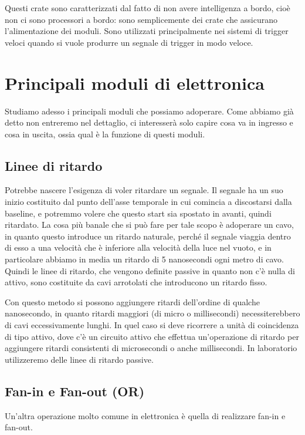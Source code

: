 Questi crate sono caratterizzati dal fatto di non avere intelligenza a bordo, cioè non ci sono processori a bordo: sono semplicemente dei crate che assicurano l'alimentazione dei moduli. Sono utilizzati principalmente nei sistemi di trigger veloci quando si vuole produrre un segnale di trigger in modo veloce.

\section{Principali moduli di elettronica}
Studiamo adesso i principali moduli che possiamo adoperare. Come abbiamo già detto non entreremo nel dettaglio, ci interesserà solo capire cosa va in ingresso e cosa in uscita, ossia qual è la funzione di questi moduli.
 
\subsection{Linee di ritardo}
Potrebbe nascere l'esigenza di voler ritardare un segnale. Il segnale ha un suo inizio costituito dal punto dell'asse temporale in cui comincia a discostarsi dalla baseline, e potremmo volere che questo start sia spostato in avanti, quindi ritardato. La cosa più banale che si può fare per tale scopo è adoperare un cavo, in quanto questo introduce un ritardo naturale, perché il segnale viaggia dentro di esso a una velocità che è inferiore alla velocità della luce nel vuoto, e in particolare abbiamo in media un ritardo di 5 nanosecondi ogni metro di cavo. Quindi le linee di ritardo, che vengono definite passive in quanto non c'è nulla di attivo, sono costituite da cavi arrotolati che introducono un ritardo fisso.

Con questo metodo si possono aggiungere ritardi dell'ordine di qualche nanosecondo, in quanto ritardi maggiori (di micro o millisecondi) necessiterebbero di cavi eccessivamente lunghi. In quel caso si deve ricorrere a unità di coincidenza di tipo attivo, dove c'è un circuito attivo che effettua un'operazione di ritardo per aggiungere ritardi consistenti di microsecondi o anche millisecondi. In laboratorio utilizzeremo delle linee di ritardo passive.

\subsection{Fan-in e Fan-out (OR)}
Un'altra operazione molto comune in elettronica è quella di realizzare fan-in e fan-out.

